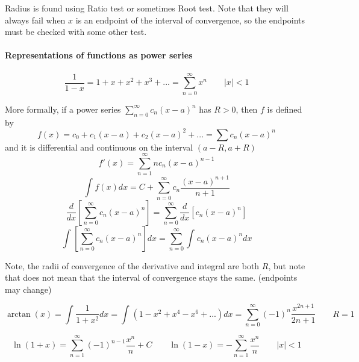 \documentclass{article}
\begin{document}
Radius is found using Ratio test or sometimes Root test. Note that they will always fail when $ x $ is an endpoint of the interval of convergence, so the endpoints must be checked with some other test.

\noindent\hrulefill 

\paragraph{Representations of functions as power series}
\[
	\frac{1}{1-x}=1+x+x^2+x^3+...= \sum_{n=0}^{\infty} x^n \qquad |x|<1
\]


More formally, if a power series $ \sum_{n=0}^{\infty} c_n(x-a)^n $ has $ R>0 $, then $ f $ is defined by
\[
	f(x) = c_0 + c_1(x-a) + c_2(x-a)^2 + ... = \sum c_n(x-a)^n
\]
and it is differential and continuous on the interval $ (a-R,a+R) $
\[
	f'(x)=\sum_{n=1}^{\infty} nc_n(x-a)^{n-1}
\]
\[
	\int_{}^{} f(x) dx = C + \sum_{n=0}^\infty c_n \frac{ (x-a)^{n+1} }{ n+1 } 
\]
\[
\frac{d}{dx} \left[ \sum_{n=0}^\infty c_n(x-a)^n \right] =  \sum_{n=0}^{\infty} \frac{d}{dx}[c_n(x-a)^n] 
\]
\[
	\int_{}^{} \left[ \sum_{n=0}^\infty c_n(x-a)^n \right] dx=
	 \sum_{n=0}^{\infty} \int_{}^{} c_n(x-a)^n dx  
\]

Note, the radii of convergence of the derivative and integral are both $ R $, but note that does not mean that the interval of convergence stays the same. (endpoints may change)

\[
	\arctan(x) = \int_{}^{} \frac{1}{1+x^2} dx = \int_{}^{} (1-x^2+x^4-x^6+...) dx   = 
	 \sum_{n=0}^{\infty} (-1)^n \frac{ x^{2n+1} }{ 2n+1 } \qquad R=1 
\]

\[
	\ln{(1+x)} = \sum_{n=1}^{\infty} (-1)^{n-1} \frac{ x^n }{ n } +C  \qquad \ln{(1-x)}=-  \sum_{n=1}^{\infty} \frac{ x^n }{ n } \qquad |x|<1
\]




\end{document}
